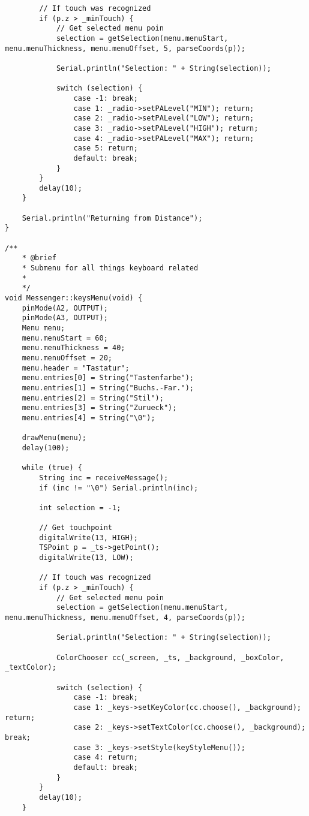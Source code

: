 \documentclass[a4paper, 11pt]{scrartcl}
\begin{document}
\begin{lstlisting}
        // If touch was recognized
        if (p.z > _minTouch) {
            // Get selected menu poin
            selection = getSelection(menu.menuStart, menu.menuThickness, menu.menuOffset, 5, parseCoords(p));

            Serial.println("Selection: " + String(selection));
            
            switch (selection) {
                case -1: break;
                case 1: _radio->setPALevel("MIN"); return;
                case 2: _radio->setPALevel("LOW"); return;
                case 3: _radio->setPALevel("HIGH"); return;
                case 4: _radio->setPALevel("MAX"); return;
                case 5: return;
                default: break;
            }
        }
        delay(10);
    }

    Serial.println("Returning from Distance");
}

/**
    * @brief
    * Submenu for all things keyboard related
    * 
    */
void Messenger::keysMenu(void) {
    pinMode(A2, OUTPUT);
    pinMode(A3, OUTPUT);
    Menu menu;
    menu.menuStart = 60;
    menu.menuThickness = 40;
    menu.menuOffset = 20;
    menu.header = "Tastatur";
    menu.entries[0] = String("Tastenfarbe");
    menu.entries[1] = String("Buchs.-Far.");
    menu.entries[2] = String("Stil");
    menu.entries[3] = String("Zurueck");
    menu.entries[4] = String("\0");

    drawMenu(menu);
    delay(100);

    while (true) {
        String inc = receiveMessage();
        if (inc != "\0") Serial.println(inc);

        int selection = -1;
        
        // Get touchpoint
        digitalWrite(13, HIGH);
        TSPoint p = _ts->getPoint();
        digitalWrite(13, LOW);

        // If touch was recognized
        if (p.z > _minTouch) {
            // Get selected menu poin
            selection = getSelection(menu.menuStart, menu.menuThickness, menu.menuOffset, 4, parseCoords(p));

            Serial.println("Selection: " + String(selection));

            ColorChooser cc(_screen, _ts, _background, _boxColor, _textColor);
            
            switch (selection) {
                case -1: break;
                case 1: _keys->setKeyColor(cc.choose(), _background); return;
                case 2: _keys->setTextColor(cc.choose(), _background); break;
                case 3: _keys->setStyle(keyStyleMenu());
                case 4: return;
                default: break;
            }
        }
        delay(10);
    }


\end{lstlisting}
\end{document}
